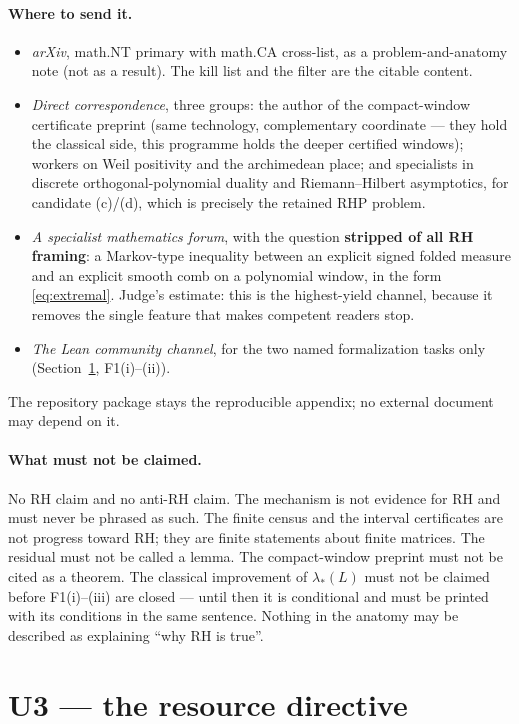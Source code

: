 \documentclass[11pt]{article}
\theoremstyle{remark}
\begin{document}
\paragraph{Where to send it.}
\begin{itemize}
\item \emph{arXiv}, math.NT primary with math.CA cross-list, as a
problem-and-anatomy note (not as a result).  The kill list and the
filter are the citable content.
\item \emph{Direct correspondence}, three groups: the author of the
compact-window certificate preprint (same technology, complementary
coordinate --- they hold the classical side, this programme holds the
deeper certified windows); workers on Weil positivity and the
archimedean place; and specialists in discrete orthogonal-polynomial
duality and Riemann--Hilbert asymptotics, for candidate (c)/(d),
which is precisely the retained RHP problem.
\item \emph{A specialist mathematics forum}, with the question
\textbf{stripped of all RH framing}: a Markov-type inequality between
an explicit signed folded measure and an explicit smooth comb on a
polynomial window, in the form \eqref{eq:extremal}.  Judge's estimate:
this is the highest-yield channel, because it removes the single
feature that makes competent readers stop.
\item \emph{The Lean community channel}, for the two named
formalization tasks only (Section~\ref{sec:u3}, F1(i)--(ii)).
\end{itemize}
The repository package stays the reproducible appendix; no external
document may depend on it.

\paragraph{What must not be claimed.}
No RH claim and no anti-RH claim.  The mechanism is not evidence for
RH and must never be phrased as such.  The finite census and the
interval certificates are not progress toward RH; they are finite
statements about finite matrices.  The residual must not be called a
lemma.  The compact-window preprint must not be cited as a theorem.
The classical improvement of $\lambda_*(L)$ must not be claimed
before F1(i)--(iii) are closed --- until then it is conditional and
must be printed with its conditions in the same sentence.  Nothing in
the anatomy may be described as explaining ``why RH is true''.

\section{U3 --- the resource directive}\label{sec:u3}
\end{document}
